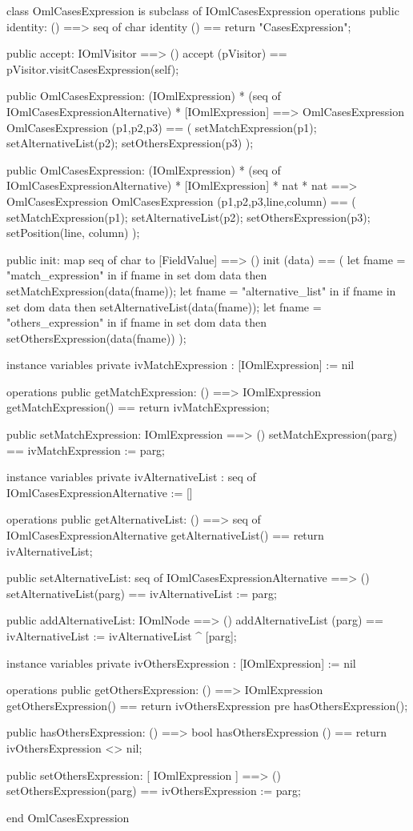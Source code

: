 \begin{vdm_al}
class OmlCasesExpression is subclass of IOmlCasesExpression
operations
  public identity: () ==> seq of char
  identity () == return "CasesExpression";

  public accept: IOmlVisitor ==> ()
  accept (pVisitor) == pVisitor.visitCasesExpression(self);

  public OmlCasesExpression:
    (IOmlExpression) *
    (seq of IOmlCasesExpressionAlternative) *
    [IOmlExpression] ==> OmlCasesExpression
  OmlCasesExpression (p1,p2,p3) == 
    ( setMatchExpression(p1);
      setAlternativeList(p2);
      setOthersExpression(p3) );

  public OmlCasesExpression:
    (IOmlExpression) *
    (seq of IOmlCasesExpressionAlternative) *
    [IOmlExpression] *
    nat *
    nat ==> OmlCasesExpression
  OmlCasesExpression (p1,p2,p3,line,column) == 
    ( setMatchExpression(p1);
      setAlternativeList(p2);
      setOthersExpression(p3);
      setPosition(line, column) );

  public init: map seq of char to [FieldValue] ==> ()
  init (data) ==
    ( let fname = "match_expression" in
        if fname in set dom data
        then setMatchExpression(data(fname));
      let fname = "alternative_list" in
        if fname in set dom data
        then setAlternativeList(data(fname));
      let fname = "others_expression" in
        if fname in set dom data
        then setOthersExpression(data(fname)) );

instance variables
  private ivMatchExpression : [IOmlExpression] := nil

operations
  public getMatchExpression: () ==> IOmlExpression
  getMatchExpression() == return ivMatchExpression;

  public setMatchExpression: IOmlExpression ==> ()
  setMatchExpression(parg) == ivMatchExpression := parg;

instance variables
  private ivAlternativeList : seq of IOmlCasesExpressionAlternative := []

operations
  public getAlternativeList: () ==> seq of IOmlCasesExpressionAlternative
  getAlternativeList() == return ivAlternativeList;

  public setAlternativeList: seq of IOmlCasesExpressionAlternative ==> ()
  setAlternativeList(parg) == ivAlternativeList := parg;

  public addAlternativeList: IOmlNode ==> ()
  addAlternativeList (parg) == ivAlternativeList := ivAlternativeList ^ [parg];

instance variables
  private ivOthersExpression : [IOmlExpression] := nil

operations
  public getOthersExpression: () ==> IOmlExpression
  getOthersExpression() == return ivOthersExpression
    pre hasOthersExpression();

  public hasOthersExpression: () ==> bool
  hasOthersExpression () == return ivOthersExpression <> nil;

  public setOthersExpression: [ IOmlExpression ] ==> ()
  setOthersExpression(parg) == ivOthersExpression := parg;

end OmlCasesExpression
\end{vdm_al}

